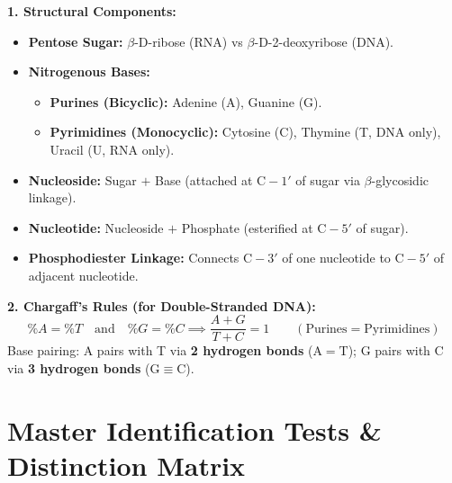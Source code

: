 \documentclass[10pt,twoside,openright]{book}
\begin{document}
\begin{formulabox}
\textbf{1. Structural Components:}
\begin{itemize}
  \item \textbf{Pentose Sugar:} $\beta$-D-ribose (RNA) vs $\beta$-D-2-deoxyribose (DNA).
  \item \textbf{Nitrogenous Bases:}
  \begin{itemize}
    \item \textbf{Purines (Bicyclic):} Adenine (A), Guanine (G).
    \item \textbf{Pyrimidines (Monocyclic):} Cytosine (C), Thymine (T, DNA only), Uracil (U, RNA only).
  \end{itemize}
  \item \textbf{Nucleoside:} Sugar $+$ Base (attached at $\mathrm{C-1'}$ of sugar via $\beta$-glycosidic linkage).
  \item \textbf{Nucleotide:} Nucleoside $+$ Phosphate (esterified at $\mathrm{C-5'}$ of sugar).
  \item \textbf{Phosphodiester Linkage:} Connects $\mathrm{C-3'}$ of one nucleotide to $\mathrm{C-5'}$ of adjacent nucleotide.
\end{itemize}
\textbf{2. Chargaff's Rules (for Double-Stranded DNA):}
\begin{equation}
  \%A = \%T \quad \text{and} \quad \%G = \%C \implies \frac{A+G}{T+C} = 1 \qquad (\text{Purines} = \text{Pyrimidines})
\end{equation}
Base pairing: A pairs with T via \textbf{2 hydrogen bonds} ($\mathrm{A=T}$); G pairs with C via \textbf{3 hydrogen bonds} ($\mathrm{G\equiv C}$).
\end{formulabox}

\section{Master Identification Tests \& Distinction Matrix}
\end{document}
